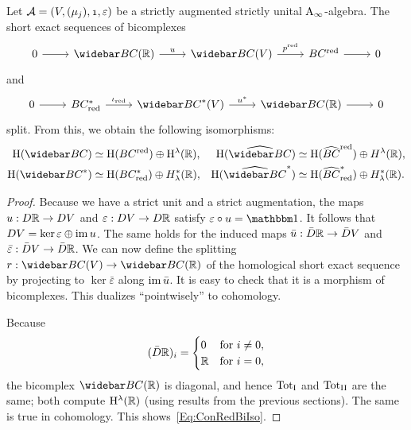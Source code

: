\documentclass[\MainFolder/Text.tex]{subfiles}
\begin{document}
\begin{Lemma}\label{Lem:ConBiRed}
Let $\mathcal{A}=(V,(\mu_j),\NOne,\varepsilon)$ be a strictly augmented strictly unital $\mathrm{A}_\infty$-algebra. The short exact sequences of bicomplexes
\[\begin{tikzcd}
 0 \arrow{r} &  \NConCycBi(\R) \arrow{r}{u} & \NConCycBi(V)\arrow{r}{p^{\RedMRM}} & \ConCycBi^{\RedMRM} \arrow{r} & 0
\end{tikzcd}\]
and
\[\begin{tikzcd}
 0 \arrow{r} & \ConCycBi_{\RedMRM}^* \arrow{r}{\iota_{\RedMRM}} & \NConCycBi^*(V) \arrow{r}{u^*} & \NConCycBi(\R) \arrow{r} & 0
\end{tikzcd}\]
split. From this, we obtain the following isomorphisms:
\begin{equation}\label{Eq:ConRedBiIso}
\begin{aligned}
\H(\NConCycBi)&\simeq  \H(\ConCycBi^{\RedMRM}) \oplus \H^\lambda(\R), & \H( \widehat{\NConCycBi}) &\simeq  \H(\widehat{\ConCycBi}^{\RedMRM})\oplus H^\lambda(\R), \\
\H(\NConCycBi^*) &\simeq \H(\ConCycBi^*_{\RedMRM}) \oplus H_\lambda^*(\R), & \H(\widehat{\NConCycBi}^*) &\simeq  \H(\widehat{\ConCycBi}^*_{\RedMRM})\oplus H_\lambda^*(\R).
\end{aligned}
\end{equation}
\end{Lemma}
\begin{proof}
Because we have a strict unit and a strict augmentation, the maps $u: D \mathbb{R} \rightarrow D V$ and $\varepsilon: D V \rightarrow D \mathbb{R}$ satisfy $\varepsilon \circ u = \Id$. It follows that $D V = \ker\varepsilon\oplus\operatorname{im} u$. The same holds for the induced maps $\bar{u}: \bar{D} \mathbb{R} \rightarrow \bar{D} V$ and $\bar{\varepsilon}: \bar{D} V \rightarrow \bar{D} \mathbb{R}$. We can now define the splitting $r: \NConCycBi(V) \rightarrow \NConCycBi(\R)$ of the homological short exact sequence by projecting to $\ker \bar{\varepsilon}$ along $\operatorname{im} \bar{u}$. It is easy to check that it is a morphism of bicomplexes. This dualizes ``pointwisely'' to cohomology.

Because 
\[ (\bar{D} \mathbb{R})_i = \begin{cases} 0 & \text{for }i \neq 0, \\ \mathbb{R} & \text{for } i = 0, \end{cases} \]
the bicomplex $\NConCycBi(\R)$ is diagonal, and hence ${\mathrm{Tot}_{\mathrm{I}}}$ and ${\mathrm{Tot}_{\mathrm{II}}}$ are the same; both compute $\mathrm{H}^\lambda(\mathbb{R})$ (using results from the previous sections). The same is true in cohomology. This shows~\eqref{Eq:ConRedBiIso}.
\end{proof} 
\end{document}
